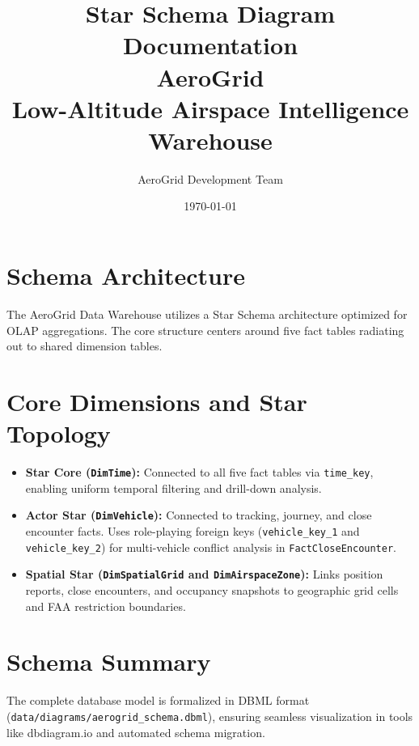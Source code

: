 \documentclass[11pt,a4paper]{article}
\title{\textbf{Star Schema Diagram Documentation}\\[0.5cm] \textbf{AeroGrid}\\[0.3cm] Low-Altitude Airspace Intelligence Warehouse}
\author{AeroGrid Development Team}
\date{\today}
\begin{document}
\maketitle

\section{Schema Architecture}
The AeroGrid Data Warehouse utilizes a Star Schema architecture optimized for OLAP aggregations. The core structure centers around five fact tables radiating out to shared dimension tables.

\section{Core Dimensions and Star Topology}
\begin{itemize}
    \item \textbf{Star Core (\texttt{DimTime}):} Connected to all five fact tables via \texttt{time\_key}, enabling uniform temporal filtering and drill-down analysis.
    \item \textbf{Actor Star (\texttt{DimVehicle}):} Connected to tracking, journey, and close encounter facts. Uses role-playing foreign keys (\texttt{vehicle\_key\_1} and \texttt{vehicle\_key\_2}) for multi-vehicle conflict analysis in \texttt{FactCloseEncounter}.
    \item \textbf{Spatial Star (\texttt{DimSpatialGrid} and \texttt{DimAirspaceZone}):} Links position reports, close encounters, and occupancy snapshots to geographic grid cells and FAA restriction boundaries.
\end{itemize}

\section{Schema Summary}
The complete database model is formalized in DBML format (\texttt{data/diagrams/aerogrid\_schema.dbml}), ensuring seamless visualization in tools like dbdiagram.io and automated schema migration.
\end{document}
